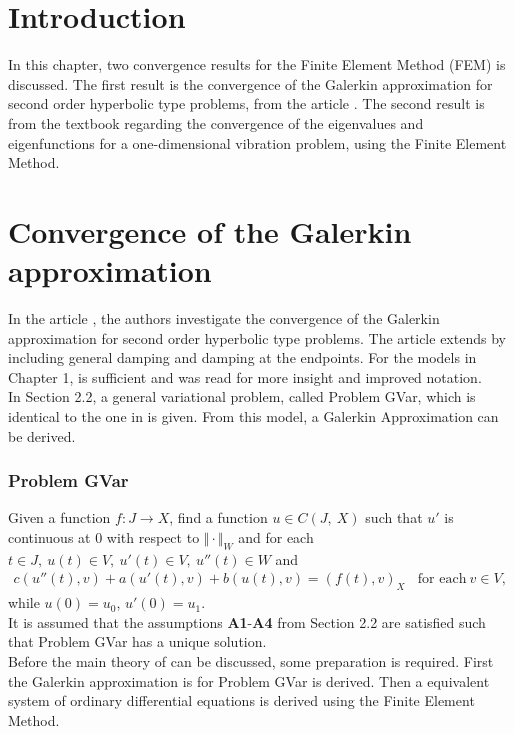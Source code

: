 \documentclass[../../main.tex]{subfiles}
\begin{document}
\section{Introduction}
In this chapter, two convergence results for the Finite Element Method (FEM) is discussed. The first result is the convergence of the Galerkin approximation for second order hyperbolic type problems, from the article \cite{BV13}. The second result is from the textbook \cite{SF97} regarding the convergence of the eigenvalues and eigenfunctions for a one-dimensional vibration problem, using the Finite Element Method.

\section{Convergence of the Galerkin approximation}
In the article \cite{BV13}, the authors investigate the convergence of the Galerkin approximation for second order hyperbolic type problems. The article \cite{BV18} extends \cite{BV13} by including general damping and damping at the endpoints. For the models in Chapter 1, \cite{BV13} is sufficient and \cite{BV18} was read for more insight and improved notation.\\

In Section 2.2, a general variational problem, called Problem GVar, which is identical to the one in \cite{VV02} is given. From this model, a Galerkin Approximation can be derived.

\subsubsection*{Problem GVar}
Given a function $f:J\rightarrow X$, find a function $u\in C(J,\ X)$ such that $u'$ is continuous at $0$ with respect to $\Vert \cdot \Vert_{W}$ and for each $t\in J,\ u(t)\in V,\ u'(t) \in V,\ u''(t)\in W$ and
\begin{eqnarray}
	c(u''(t),v)+a(u'(t),v)+b(u(t),v)= (f(t),v)_{X} \ \ \ \ \textrm{for each} \ v \in V, \label{GV_PB1}
\end{eqnarray}
while $u(0)=u_{0}$, $u'(0)=u_{1}$.\\

It is assumed that the assumptions \textbf{A1}-\textbf{A4} from Section 2.2 are satisfied such that Problem GVar has a unique solution.\\

Before the main theory of \cite{BV13} can be discussed, some preparation is required. First the Galerkin approximation is for Problem GVar is derived. Then a equivalent system of ordinary differential equations is derived using the Finite Element Method.\\
\end{document}
